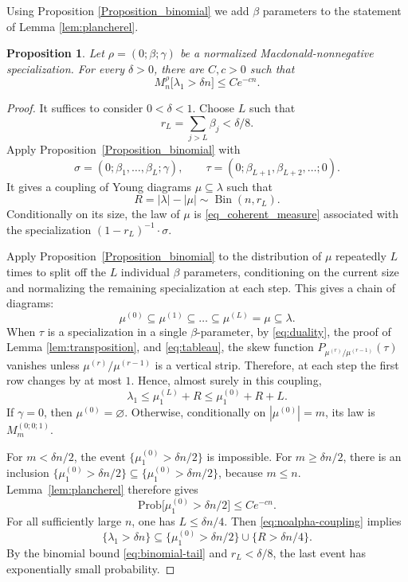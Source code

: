 \documentclass[11pt,reqno]{amsart}
\newtheorem{proposition}[theorem]{Proposition}
\theoremstyle{definition}
\theoremstyle{remark}
\numberwithin{equation}{section}
\DeclareMathOperator{\Bin}{Bin}
\begin{document}
Using Proposition \ref{Proposition_binomial} we add $\beta$ parameters to the statement of Lemma \ref{lem:plancherel}.

\begin{proposition}\label{Proposition_noalpha_bound}
Let $\rho=(0;\beta;\gamma)$ be a normalized Macdonald-nonnegative specialization. For every
$\delta>0$, there are $C,c>0$ such that
\begin{equation}\label{eq:noalpha}
 M_n^\rho\bigl[\lambda_1>\delta n\bigr]\le Ce^{-cn}.
\end{equation}
\end{proposition}

\begin{proof}
It suffices to consider $0<\delta<1$. Choose $L$ such that
\[
 r_L=\sum_{j>L}\beta_j<\delta/8.
\]
Apply Proposition~\ref{Proposition_binomial} with
\[
 \sigma=(0;\beta_1,\ldots,\beta_L;\gamma),\qquad
 \tau=(0;\beta_{L+1},\beta_{L+2},\ldots;0).
\]
It gives a coupling of Young diagrams $\mu\subseteq\lambda$ such that
\[
 R=|\lambda|-|\mu|\sim\Bin(n,r_L).
\]
Conditionally on its size, the law of $\mu$ is \eqref{eq_coherent_measure} associated with the specialization
$(1-r_L)^{-1}\cdot\sigma$.

Apply Proposition~\ref{Proposition_binomial} to the distribution of $\mu$ repeatedly $L$ times to split off the $L$
individual $\beta$ parameters, conditioning on the current size and
normalizing the remaining specialization at each step. This gives a chain of diagrams:
$$
 \mu^{(0)}\subseteq\mu^{(1)}\subseteq\dots \subseteq \mu^{(L)}=\mu\subseteq \lambda.
$$
When $\tau$ is a specialization in a single $\beta$-parameter, by \eqref{eq:duality}, the proof of Lemma \ref{lem:transposition}, and \eqref{eq:tableau}, the skew function $P_{\mu^{(r)}/\mu^{(r-1)}}(\tau)$ vanishes unless $\mu^{(r)}/\mu^{(r-1)}$
is a vertical strip. Therefore, at each step the first row changes by at most $1$. Hence, almost surely in this coupling,
\begin{equation}\label{eq:noalpha-coupling}
 \lambda_1\le\mu^{(L)}_1+R\le\mu^{(0)}_1+R+L.
\end{equation}
If $\gamma=0$, then $\mu^{(0)}=\varnothing$. Otherwise, conditionally on
$|\mu^{(0)}|=m$, its law is $M_m^{(0;0;1)}$. 

For $m<\delta n/2$, the event
$\{\mu^{(0)}_1>\delta n/2\}$ is impossible. For $m\ge\delta n/2$, there is an inclusion
$\{\mu^{(0)}_1>\delta n/2\}\subseteq \{\mu^{(0)}_1>\delta m/2\}$, because $m\le n$. Lemma~\ref{lem:plancherel}
therefore gives
\[
 \mathrm{Prob} \bigl[\mu^{(0)}_1>\delta n/2\bigr]\le Ce^{-cn}.
\]
For all sufficiently large $n$, one has $L\le\delta n/4$.
Then \eqref{eq:noalpha-coupling} implies
\[
 \{\lambda_1>\delta n\}
 \subseteq\{\mu^{(0)}_1>\delta n/2\}\cup\{R>\delta n/4\}.
\]
By the binomial bound \eqref{eq:binomial-tail} and $r_L<\delta/8$, the last event has
exponentially small probability.
\end{proof}
\end{document}
